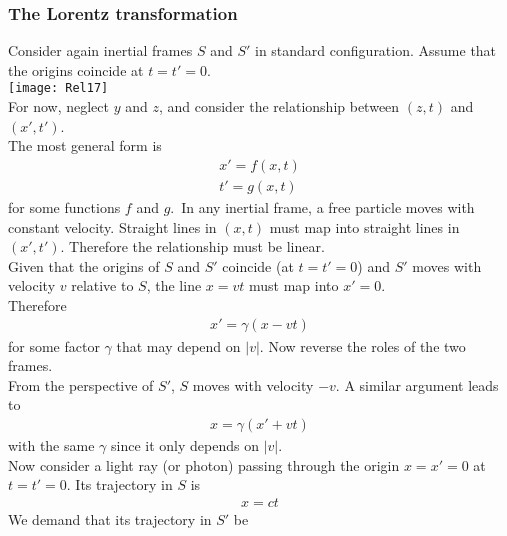 \documentclass[a4paper]{article}
\begin{document}
\subsubsection{The Lorentz transformation}
Consider again inertial frames $S$ and $S'$ in standard configuration. Assume that the origins coincide at $t=t'=0$.\\
\texttt{[image: Rel17]}\\
For now, neglect $y$ and $z$, and consider the relationship between $\left(z,t\right)$ and $\left(x',t'\right)$.\\
The most general form is
\begin{equation*}
\begin{aligned}
x'=f\left(x,t\right)\\
t'=g\left(x,t\right)
\end{aligned}
\end{equation*}
for some functions $f$ and $g$.\
In any inertial frame, a free particle moves with constant velocity. Straight lines in $\left(x,t\right)$ must map into straight lines in $\left(x',t'\right)$. Therefore the relationship must be linear.\\
Given that the origins of $S$ and $S'$ coincide (at $t=t'=0$) and $S'$ moves with velocity $v$ relative to $S$, the line $x=vt$ must map into $x'=0$.\\
Therefore
\begin{equation}\label{eq:1}
\begin{aligned}
x'=\gamma \left(x-vt\right)
\end{aligned}
\end{equation}
for some factor $\gamma$ that may depend on $|v|$.
Now reverse the roles of the two frames.\\
From the perspective of $S'$, $S$ moves with velocity $-v$. A similar argument leads to
\begin{equation}\label{eq:2}
\begin{aligned}
x=\gamma\left(x'+vt\right)
\end{aligned}
\end{equation}
with the same $\gamma$ since it only depends on $|v|$.\\
Now consider a light ray (or photon) passing through the origin $x=x'=0$ at $t=t'=0$. Its trajectory in $S$ is
\begin{equation*}
\begin{aligned}
x=ct
\end{aligned}
\end{equation*}
We demand that its trajectory in $S'$ be
\end{document}
